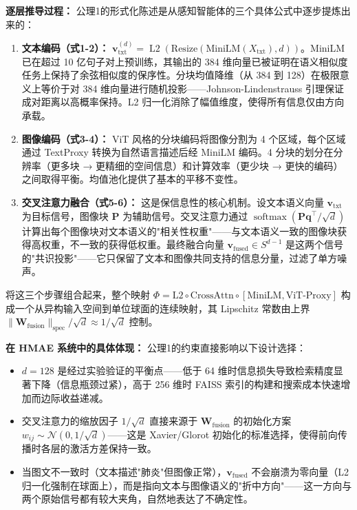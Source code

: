 \documentclass[11pt,a4paper]{ctexart}
\theoremstyle{remark}
\DeclareMathOperator{\softmax}{softmax}
\DeclareMathOperator{\Ltwo}{L2}
\begin{document}
\textbf{逐层推导过程：} 公理1的形式化陈述是从感知智能体的三个具体公式中逐步提炼出来的：
\begin{enumerate}[nosep]
\item \textbf{文本编码（式1-2）：} $\mathbf{v}_{\text{txt}}^{(d)} = \Ltwo(\text{Resize}(\text{MiniLM}(X_{\text{txt}}), d))$。MiniLM 已在超过 10 亿句子对上预训练，其输出的 384 维向量已被证明在语义相似度任务上保持了余弦相似度的保序性。分块均值降维（从 384 到 128）在极限意义上等价于对 384 维向量进行随机投影——Johnson-Lindenstrauss 引理保证成对距离以高概率保持。L2 归一化消除了幅值维度，使得所有信息仅由方向承载。
\item \textbf{图像编码（式3-4）：} ViT 风格的分块编码将图像分割为 4 个区域，每个区域通过 TextProxy 转换为自然语言描述后经 MiniLM 编码。4 分块的划分在分辨率（更多块 → 更精细的空间信息）和计算效率（更少块 → 更快的编码）之间取得平衡。均值池化提供了基本的平移不变性。
\item \textbf{交叉注意力融合（式5-6）：} 这是保信息性的核心机制。设文本语义向量 $\mathbf{v}_{\text{txt}}$ 为目标信号，图像块 $\mathbf{P}$ 为辅助信号。交叉注意力通过 $\softmax(\mathbf{P}\mathbf{q}^{\top}/\sqrt{d})$ 计算出每个图像块对文本语义的"相关性权重"——与文本语义一致的图像块获得高权重，不一致的获得低权重。最终融合向量 $\mathbf{v}_{\text{fused}} \in S^{d-1}$ 是这两个信号的"共识投影"——它只保留了文本和图像共同支持的信息分量，过滤了单方噪声。
\end{enumerate}
将这三个步骤组合起来，整个映射 $\Phi = \text{L2} \circ \text{CrossAttn} \circ [\text{MiniLM}, \text{ViT-Proxy}]$ 构成一个从异构输入空间到单位球面的连续映射，其 Lipschitz 常数由上界 $\|\mathbf{W}_{\text{fusion}}\|_{\text{spec}} / \sqrt{d} \approx 1/\sqrt{d}$ 控制。

\textbf{在 HMAE 系统中的具体体现：} 公理1的约束直接影响以下设计选择：
\begin{itemize}[nosep]
\item $d=128$ 是经过实验验证的平衡点——低于 64 维时信息损失导致检索精度显著下降（信息瓶颈过紧），高于 256 维时 FAISS 索引的构建和搜索成本快速增加而边际收益递减。
\item 交叉注意力的缩放因子 $1/\sqrt{d}$ 直接来源于 $\mathbf{W}_{\text{fusion}}$ 的初始化方案 $w_{ij} \sim \mathcal{N}(0, 1/\sqrt{d})$——这是 Xavier/Glorot 初始化的标准选择，使得前向传播时各层的激活方差保持一致。
\item 当图文不一致时（文本描述"肺炎"但图像正常），$\mathbf{v}_{\text{fused}}$ 不会崩溃为零向量（L2 归一化强制在球面上），而是指向文本与图像语义的"折中方向"——这一方向与两个原始信号都有较大夹角，自然地表达了不确定性。
\end{itemize}
\end{document}
